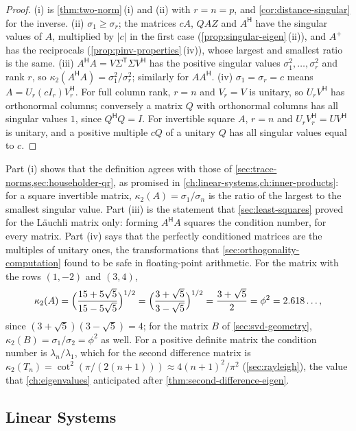 \begin{proof}
(i) is \cref{thm:two-norm}\,(i) and (ii) with $r=n=p$, and \cref{cor:distance-singular} for the inverse. (ii) $\sigma_1\ge\sigma_r$; the matrices $cA$, $QAZ$ and $A^{\mathsf H}$ have the singular values of $A$, multiplied by $|c|$ in the first case (\cref{prop:singular-eigen}\,(ii)), and $A^+$ has the reciprocals (\cref{prop:pinv-properties}\,(iv)), whose largest and smallest ratio is the same. (iii) $A^{\mathsf H}A=V\Sigma^{\mathsf T}\Sigma V^{\mathsf H}$ has the positive singular values $\sigma_1^2,\ldots,\sigma_r^2$ and rank $r$, so $\kappa_2(A^{\mathsf H}A)=\sigma_1^2/\sigma_r^2$; similarly for $AA^{\mathsf H}$. (iv) $\sigma_1=\sigma_r=c$ means $A=U_r(cI_r)V_r^{\mathsf H}$. For full column rank, $r=n$ and $V_r=V$ is unitary, so $U_rV^{\mathsf H}$ has orthonormal columns; conversely a matrix $Q$ with orthonormal columns has all singular values $1$, since $Q^{\mathsf H}Q=I$. For invertible square $A$, $r=n$ and $U_rV_r^{\mathsf H}=UV^{\mathsf H}$ is unitary, and a positive multiple $cQ$ of a unitary $Q$ has all singular values equal to $c$.
\end{proof}

Part (i) shows that the definition agrees with those of \cref{sec:trace-norms,sec:householder-qr}, as promised in \cref{ch:linear-systems,ch:inner-products}: for a square invertible matrix, $\kappa_2(A)=\sigma_1/\sigma_n$ is the ratio of the largest to the smallest singular value. Part (iii) is the statement that \cref{sec:least-squares} proved for the L\"auchli matrix only: forming $A^{\mathsf H}A$ squares the condition number, for every matrix. Part (iv) says that the perfectly conditioned matrices are the multiples of unitary ones, the transformations that \cref{sec:orthogonality-computation} found to be safe in floating-point arithmetic. For the matrix with the rows $(1,-2)$ and $(3,4)$,
\[
\kappa_2(A)=\Bigl(\frac{15+5\sqrt5}{15-5\sqrt5}\Bigr)^{1/2}=\Bigl(\frac{3+\sqrt5}{3-\sqrt5}\Bigr)^{1/2}=\frac{3+\sqrt5}2=\phi^2=2.618\ldots,
\]
since $(3+\sqrt5)(3-\sqrt5)=4$; for the matrix $B$ of \cref{sec:svd-geometry}, $\kappa_2(B)=\sigma_1/\sigma_2=\phi^2$ as well. For a positive definite matrix the condition number is $\lambda_n/\lambda_1$, which for the second difference matrix is $\kappa_2(T_n)=\cot^2(\pi/(2(n+1)))\approx4(n+1)^2/\pi^2$ (\cref{sec:rayleigh}), the value that \cref{ch:eigenvalues} anticipated after \cref{thm:second-difference-eigen}.

\subsection{Linear Systems}

